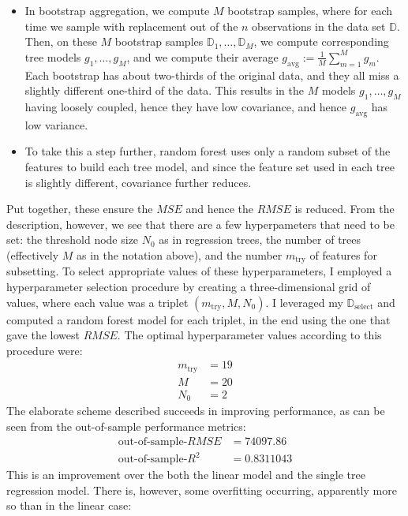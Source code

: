 \documentclass[11pt]{article}
\begin{document}
	\begin{itemize}
		\item In bootstrap aggregation, we compute
		$M$ bootstrap samples, where for each time we sample with replacement
		out of the $n$ observations in the data set $\mathbb{D}$. Then,
		on these $M$ bootstrap samples $\mathbb{D}_1,\ldots,\mathbb{D}_M$,
		we compute corresponding tree models $g_1,\ldots,g_M$, and we compute
		their average $g_{\text{avg}} := \frac{1}{M}\sum_{m=1}^{M}g_m$. Each
		bootstrap has about two-thirds of the original data, and they all
		miss a slightly different one-third of the data. This results in the
		$M$ models $g_1,\ldots,g_M$ having loosely coupled, hence they
		have low covariance, and hence $g_{\text{avg}}$ has low variance.
		\item To take this a step further, random forest uses only a random subset of
		the features to build each tree model, and since the feature set
		used in each tree is slightly different, covariance further reduces.
	\end{itemize}
	Put together, these ensure the $MSE$ and hence the $RMSE$ is reduced.
	From the description, however, we see that there are a few hyperpameters
	that need to be set: the threshold node size $N_0$ as in regression trees,
	the number of trees (effectively $M$ as in the notation above), and the number
	$m_{\text{try}}$ of features for subsetting. To select appropriate values
	of these hyperparameters, I employed a hyperparameter selection procedure
	by creating a three-dimensional grid of values, where each value
	was a triplet $(m_{\text{try}}, M, N_0)$. I leveraged my $\mathbb{D}_{\text{select}}$
	and computed a random forest model for each triplet, in the end using
	the one that gave the lowest $RMSE$. The optimal hyperparameter values
	according to this procedure were:
	\begin{align*}
		m_{\text{try}} &= 19\\
		M &= 20\\
		N_0 &= 2
	\end{align*}
	The elaborate scheme described succeeds in improving performance, as
	can be seen from the out-of-sample performance metrics:
	\begin{align*}
		\text{out-of-sample-}RMSE &= 74097.86\\
		\text{out-of-sample-} R^2 &= 0.8311043 
	\end{align*}
	This is an improvement over the both the linear model and the
	single tree regression model. There is, however, some overfitting
	occurring, apparently more so than in the linear case:
\end{document}
